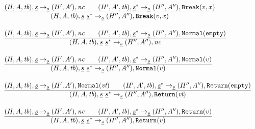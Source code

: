 \[\begin{array}{l@{~~}l@{~~}ll}
\frac{\begin{matrix}
\state,\ir\stmt \rightarrow_{\ir\stmt} \resp,\nc
\rulesep
\statep,\ir{\stmt}^* \rightarrow_{\ir\stmt} \respp,{\tt Break}(v,x)
\end{matrix}}{\begin{matrix}
\state,\ir\stmt\ \ir\stmt^* \rightarrow_{\ir{\stmt}} \respp,{\tt Break}(v,x)
\end{matrix}}\\[2em]

\frac{\begin{matrix}
\state,\ir\stmt \rightarrow_{\ir\stmt} \resp,\nc
\rulesep
\statep,\ir{\stmt}^* \rightarrow_{\ir\stmt} \respp,\void
\end{matrix}}{\begin{matrix}
\state,\ir\stmt\ \ir\stmt^* \rightarrow_{\ir{\stmt}} \respp,\nc
\end{matrix}}\\[2em]

\frac{\begin{matrix}
\state,\ir\stmt \rightarrow_{\ir\stmt} \resp,\nc
\rulesep
\statep,\ir\stmt^* \rightarrow_{\ir\stmt} \respp,{\tt Normal}(v)
\end{matrix}}{\begin{matrix}
\state,\ir\stmt\ \ir\stmt^* \rightarrow_{\ir{\stmt}} \respp,{\tt Normal}(v)
\end{matrix}}\\[2em]

\frac{\begin{matrix}
\state,\ir\stmt \rightarrow_{\ir\stmt} \resp,{\tt Normal}(\vorempty)
\rulesep
\statep,\ir{\stmt}^* \rightarrow_{\ir\stmt} \respp,{\tt Return}({\tt empty})
\end{matrix}}{\begin{matrix}
\state,\ir\stmt\ \ir\stmt^* \rightarrow_{\ir{\stmt}} \respp,{\tt Return}(\vorempty)
\end{matrix}}\\[2em]

\frac{\begin{matrix}
\state,\ir\stmt \rightarrow_{\ir\stmt} \resp,\nc
\rulesep
\statep,\ir\stmt^* \rightarrow_{\ir\stmt} \respp,{\tt Return}(v)
\end{matrix}}{\begin{matrix}
\state,\ir\stmt\ \ir\stmt^* \rightarrow_{\ir{\stmt}} \respp,{\tt Return}(v)
\end{matrix}}\\[4em]


\end{array}\]
